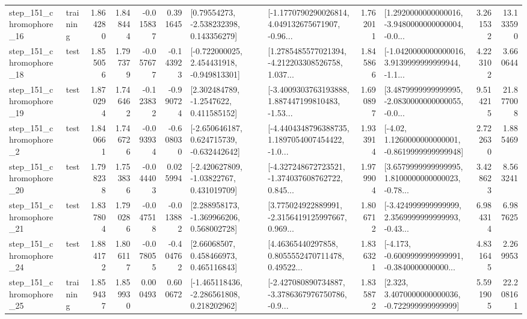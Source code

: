 \begin{tabular}{llrrrrllrlrr}
  step\_151\_chromophore\_16 &  training &      1.864280 &    1.848444 &     -0.015837 &  0.391645 &     [0.79554273, -2.538232398, 0.143356279] &  [-1.1770790290026814, 4.049132675671907, -0.96... &       1.762011 &  [1.2920000000000016, -3.9480000000000004, -0.0... &            3.261532 &         13.133590 \\
  step\_151\_chromophore\_18 &      test &      1.855056 &    1.797379 &     -0.057677 & -0.143923 &   [-0.722000025, 2.454431918, -0.949813301] &  [1.2785485577021394, -4.212203308526758, 1.037... &       1.845866 &  [-1.0420000000000016, 3.9139999999999944, -1.1... &            4.223102 &          3.660644 \\
  step\_151\_chromophore\_19 &      test &      1.870294 &    1.746462 &     -0.123832 & -0.990724 &      [2.302484789, -1.2547622, 0.411585152] &  [-3.4009303763193888, 1.887447199810483, -1.53... &       1.690897 &  [3.4879999999999995, -2.0830000000000055, -0.0... &            9.514215 &         21.877008 \\
   step\_151\_chromophore\_2 &      test &      1.840661 &    1.746726 &     -0.093934 & -0.608030 &   [-2.650646187, 0.624715739, -0.632442642] &  [-4.4404348796388735, 1.1897054007454422, -1.0... &       1.933914 &   [-4.02, 1.1260000000000001, -0.8619999999999948] &            2.722630 &          1.885469 \\
  step\_151\_chromophore\_20 &      test &      1.798238 &    1.753836 &     -0.044403 &  0.025994 &    [-2.420627809, -1.03822767, 0.431019709] &  [-4.327248672723521, -1.374037608762722, 0.845... &       1.979904 &  [3.6579999999999995, 1.8100000000000023, -0.78... &            3.428623 &          8.563241 \\
  step\_151\_chromophore\_21 &      test &      1.837804 &    1.790286 &     -0.047518 & -0.013882 &    [2.288958173, -1.369966206, 0.568002728] &  [3.775024922889991, -2.3156419125997667, 0.969... &       1.806712 &  [-3.424999999999999, 2.3569999999999993, -0.43... &            6.984314 &          6.987625 \\
  step\_151\_chromophore\_24 &      test &      1.884172 &    1.806117 &     -0.078055 & -0.404762 &      [2.66068507, 0.458466973, 0.465116843] &  [4.46365440297858, 0.8055552470711478, 0.49522... &       1.836321 &  [-4.173, -0.6009999999999991, -0.3840000000000... &            4.831645 &          2.269953 \\
  step\_151\_chromophore\_25 &  training &      1.859437 &    1.859930 &      0.000493 &  0.600672 &   [-1.465118436, -2.286561808, 0.218202962] &  [-2.427080890734887, -3.3786367976750786, -0.9... &       1.835872 &    [2.323, 3.4070000000000036, -0.722999999999999] &            5.591905 &         22.208161 \\

\end{tabular}
